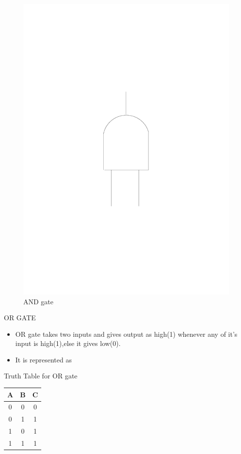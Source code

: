 \documentclass{beamer}
\begin{document}
\begin{frame}
\begin{figure}
\includegraphics[scale=0.2]{../beamer_bib/and} 
\caption{AND gate}
\end{figure}
\end{frame}
\begin{frame}[label=OR]{OR GATE}
\begin{block}{}
\begin{itemize}
  \item OR gate takes two inputs and gives output as high(1) whenever any of it's input is high(1),else it gives low(0).
  \item It is represented as 
\end{itemize}
\end{block}
\medskip
\medskip
\pause
\begin{block}{Truth Table for OR gate}
\begin{tabular}{|c|c||c|}
\hline
 \textbf{A} &
\textbf{B} & \textbf{C} \\
\hline
\hline
 0 & 0 & 0 \\
\hline
 0 & 1 & 1 \\
\hline
 1 & 0 & 1 \\
\hline
 1 & 1 & 1 \\
\hline
\end{tabular}
\end{block}
\end{frame}
\end{document}
